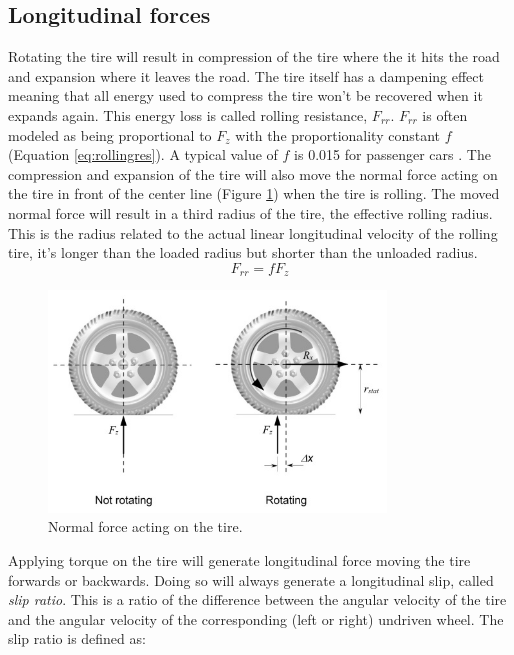 \subsection{Longitudinal forces}
Rotating the tire will result in compression of the tire where the it hits the road and expansion where it leaves the road. The tire itself has a dampening effect meaning that all energy used to compress the tire won't be recovered when it expands again. This energy loss is called rolling resistance, $ F_{rr} $. $ F_{rr} $ is often modeled as being proportional to $ F_{z} $ with the proportionality constant $ f $ (Equation \ref{eq:rollingres}). A typical value of $ f $ is 0.015 for passenger cars \cite{rajamani}. The compression and expansion of the tire will also move the normal force acting on the tire in front of the center line (Figure \ref{rolling_resistance}) when the tire is rolling. The moved normal force will result in a third radius of the tire, the effective rolling radius. This is the radius related to the actual linear longitudinal velocity of the rolling tire, it's longer than the loaded radius but shorter than the unloaded radius.
\begin{equation}
F_{rr} = fF_{z}
\label{eq:rollingres}
\end{equation}
\begin{figure}[h]
	\centering
	\includegraphics[width=0.8\textwidth]{Pictures/rolling_resistance}
	\caption{Normal force acting on the tire. \cite{rajamani}}
	\label{rolling_resistance}
\end{figure}
Applying torque on the tire will generate longitudinal force moving the tire forwards or backwards. Doing so will always generate a longitudinal slip, called \textit{slip ratio}. This is a ratio of the difference between the angular velocity of the tire and the angular velocity of the corresponding (left or right) undriven wheel. The slip ratio is defined as: 
